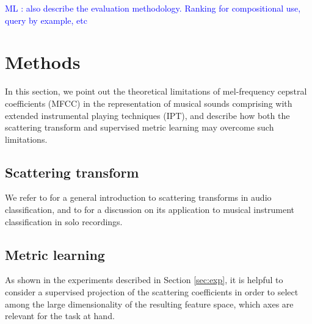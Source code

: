 \documentclass{article}
\newcommand{\ml}[1]{\textcolor{blue}{ML : #1}}
\begin{document}





\ml{also describe the evaluation methodology. Ranking for compositional use, query by example, etc}


\section{Methods}
In this section, we point out the theoretical limitations of mel-frequency cepstral coefficients (MFCC) in the representation of musical sounds comprising with extended instrumental playing techniques (IPT), and describe how both the scattering transform and supervised metric learning may overcome such limitations.


\subsection{Scattering transform} %

We refer to \cite{anden2014taslp} for a general introduction to scattering transforms in audio classification, and to \cite{lostanlen2017phd} for a discussion on its application to musical instrument classification in solo recordings.
\cite{anden2012dafx}

\subsection{Metric learning} %

As shown in the experiments described in Section \ref{sec:exp}, it is helpful to consider a supervised projection of the scattering coefficients in order to select among the large dimensionality of the resulting feature space, which axes are relevant for the task at hand.
\end{document}

